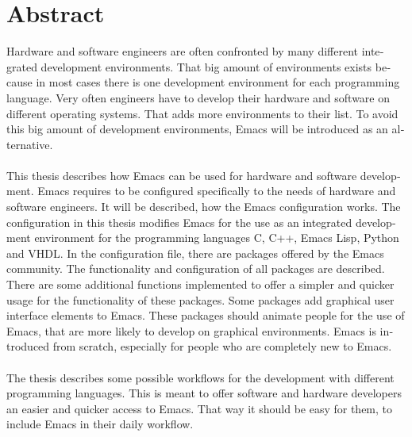 \chapter{Abstract}

\begin{english} %
Hardware and software engineers are often confronted by many different
integrated development environments. That big amount of environments
exists because in most cases there is one development environment for
each programming language. Very often engineers have to develop their
hardware and software on different operating systems. That adds more
environments to their list. To avoid this big amount of development
environments, Emacs will be introduced as an alternative.\\\\ This
thesis describes how Emacs can be used for hardware and software
development. Emacs requires to be configured specifically to the needs
of hardware and software engineers. It will be described, how the
Emacs configuration works. The configuration in this thesis modifies
Emacs for the use as an integrated development environment for the
programming languages C, C++, Emacs Lisp, Python and VHDL. In the
configuration file, there are packages offered by the Emacs
community. The functionality and configuration of all packages are
described. There are some additional functions implemented to offer a
simpler and quicker usage for the functionality of these
packages. Some packages add graphical user interface elements to
Emacs. These packages should animate people for the use of Emacs, that
are more likely to develop on graphical environments. Emacs is
introduced from scratch, especially for people who are completely new
to Emacs.\\\\ The thesis describes some possible workflows for the
development with different programming languages. This is meant to
offer software and hardware developers an easier and quicker access to
Emacs. That way it should be easy for them, to include Emacs in their
daily workflow.
\end{english}

